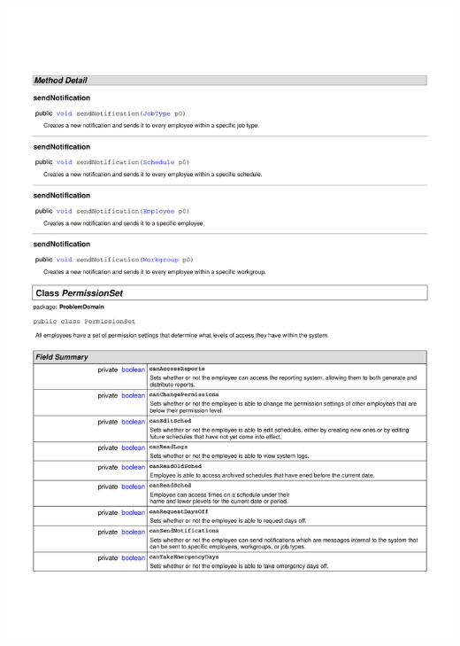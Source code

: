 \documentclass[letterpaper,12pt]{report}
\begin{document}
\includegraphics[scale=0.9,trim=20mm 30mm 25mm 25mm]{externals/ProblemDomainDataDictionary7.pdf}
\newpage
\end{document}
